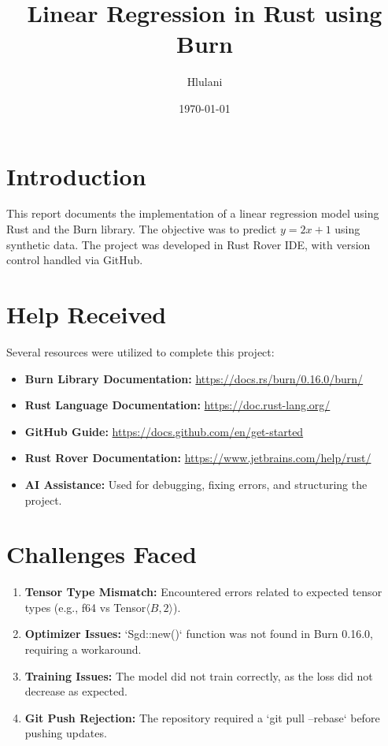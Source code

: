 \documentclass[a4paper,12pt]{article}
\title{Linear Regression in Rust using Burn}
\author{Hlulani}
\date{\today}
\begin{document}
\maketitle

\section{Introduction}
This report documents the implementation of a linear regression model using Rust and the Burn library. The objective was to predict $y = 2x + 1$ using synthetic data. The project was developed in Rust Rover IDE, with version control handled via GitHub.

\section{Help Received}
Several resources were utilized to complete this project:
\begin{itemize}
    \item \textbf{Burn Library Documentation:} \url{https://docs.rs/burn/0.16.0/burn/}
    \item \textbf{Rust Language Documentation:} \url{https://doc.rust-lang.org/}
    \item \textbf{GitHub Guide:} \url{https://docs.github.com/en/get-started}
    \item \textbf{Rust Rover Documentation:} \url{https://www.jetbrains.com/help/rust/}
    \item \textbf{AI Assistance:} Used for debugging, fixing errors, and structuring the project.
\end{itemize}

\section{Challenges Faced}
\begin{enumerate}
    \item \textbf{Tensor Type Mismatch:} Encountered errors related to expected tensor types (e.g., f64 vs Tensor$\langle B,2\rangle$).
    \item \textbf{Optimizer Issues:} `Sgd::new()` function was not found in Burn 0.16.0, requiring a workaround.
    \item \textbf{Training Issues:} The model did not train correctly, as the loss did not decrease as expected.
    \item \textbf{Git Push Rejection:} The repository required a `git pull --rebase` before pushing updates.
\end{enumerate}
\end{document}
